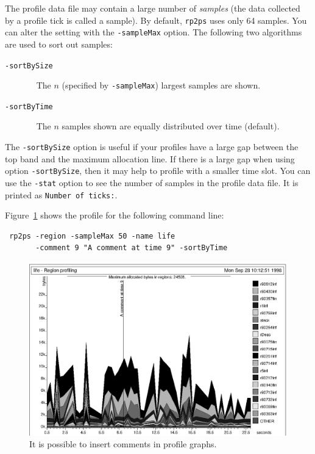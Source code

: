 \documentclass[12pt]{book}
\begin{document}
The profile data file may contain a large number of \emph{samples}
(the data collected by a profile tick is called a sample). By default,
\texttt{rp2ps} uses only 64 samples. You can alter the setting with the
%
\texttt{-sampleMax} option. The following two algorithms are used to sort
out samples:
\begin{description}
\item[{\tt -sortBySize}]~
  The $n$ (specified by \texttt{-sampleMax}) largest samples are
  shown.
\item[{\tt -sortByTime}]~
  The $n$ samples shown are equally distributed over time (default).
\end{description}
The \texttt{-sortBySize} option is useful if your profiles have a
large gap between the top band and the maximum allocation line.  If
there is a large gap when using option \texttt{-sortBySize}, then it
may help to profile with a smaller time slot. You can use the
%
{\tt -stat} option to see the number of samples in the profile data
file. It is printed as \texttt{Number of ticks:}.

Figure~\ref{prof_eks4.fig} shows the profile for the following
command line:
\begin{verbatim}
 rp2ps -region -sampleMax 50 -name life
       -comment 9 "A comment at time 9" -sortByTime
\end{verbatim}

\begin{figure}
\begin{center}
  \includegraphics{prof_eks4.ps}
\end{center}
\caption{It is possible to insert comments in profile graphs.}
\label{prof_eks4.fig}
\end{figure}
\end{document}
